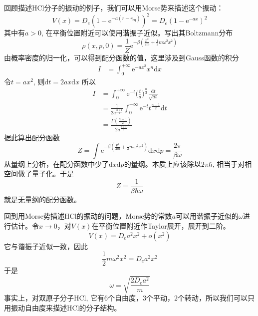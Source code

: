     回顾描述HCl分子的振动的例子，我们可以用Morse势来描述这个振动：
    \begin{equation*}
        V(x) = D_e (1- \mathrm{e}^{-a(r-r_\mathrm{eq})})^2 = D_e(1-\mathrm{e}^{-ax})^2
    \end{equation*}
    其中有$a>0$, 在平衡位置附近可以使用谐振子近似。写出其Boltzmann分布
    \begin{equation*}
        \rho(x,p,0) = \frac 1Z \mathrm{e}^{-\beta (\frac {p^2}{2m} + \frac 12 m\omega^2 x^2)} 
    \end{equation*}
    由概率密度的归一化，可以得到配分函数的值，这里涉及到Gauss函数的积分
    \begin{align*}
        I &= \int_0^{+\infty} \mathrm{e}^{-ax^2} x^{n} \mathrm{d}x
    \end{align*}
    令$t = ax^2$, 则$\mathrm{d}t = 2ax\mathrm{d}x$
    所以
    \begin{align*}
    I &= \int_0^{+\infty} \mathrm{e}^{-t} \bigg(\frac ta\bigg)^{\frac n2} \frac {\mathrm{d}t}{\sqrt{at}}\\
    &= \frac 1{2a^{\frac {n+1}2}} \int_0^{+\infty} \mathrm{e}^{-t} t^{\frac {n-1}2} \mathrm{d}t\\
    &= \frac {\Gamma(\frac {n+1}2)}{2a^{\frac {n+1}2}}
    \end{align*}
    据此算出配分函数
    \begin{equation*}
        Z = \int \mathrm{e}^{-\beta (\frac {p^2}{2m} + \frac 12 m\omega^2 x^2)} \mathrm{d}x\mathrm{d}p = \frac {2\pi}{\beta \omega}
    \end{equation*}
    从量纲上分析，在配分函数中少了$\mathrm{d}x\mathrm{d}p$的量纲。本质上应该除以$2\pi\hbar$, 相当于对相空间做了量子化。于是
    \begin{equation*}
        Z = \frac 1{\beta \hbar \omega}
    \end{equation*}
    就是无量纲的配分函数。

    回到用Morse势描述HCl的振动的问题，Morse势的常数$a$可以用谐振子近似的$\omega$进行估计。令$x \to 0 $，对$V(x)$在平衡位置附近作Taylor展开，展开到二阶。
    \begin{equation*}
        V(x) = D_e a^2 x^2 + o(x^2)
    \end{equation*}
    它与谐振子近似一致，因此
    \begin{equation*}
        \frac 12 m\omega^2x^2 = D_e a^2 x^2
    \end{equation*}
    于是
    \begin{equation*}
        \omega = \sqrt{\frac {2D_ea^2}m}
    \end{equation*}
    事实上，对双原子分子HCl, 它有6个自由度，3个平动，2个转动，所以我们可以只用振动自由度来描述HCl的分子结构。

